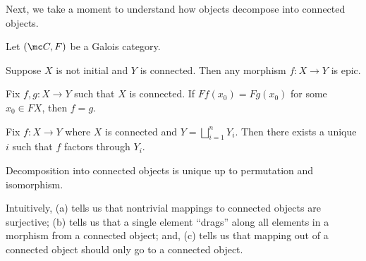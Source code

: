 \documentclass{amsart}
\begin{document}
Next, we take a moment to understand how objects decompose into connected objects.
\begin{lemma} \label{lem:connected-maps}
    Let $(\mc C,F)$ be a Galois category.
    \begin{listalph}
        \item Suppose $X$ is not initial and $Y$ is connected. Then any morphism $f\colon X\to Y$ is epic.
        \item Fix $f,g\colon X\to Y$ such that $X$ is connected. If $Ff(x_0)=Fg(x_0)$ for some $x_0\in FX$, then $f=g$.
        \item Fix $f\colon X\to Y$ where $X$ is connected and $Y=\bigsqcup_{i=1}^nY_i$. Then there exists a unique $i$ such that $f$ factors through $Y_i$.
        \item Decomposition into connected objects is unique up to permutation and isomorphism.
    \end{listalph}
\end{lemma}
Intuitively, (a) tells us that nontrivial mappings to connected objects are surjective; (b) tells us that a single element ``drags'' along all elements in a morphism from a connected object; and, (c) tells us that mapping out of a connected object should only go to a connected object.
\end{document}
